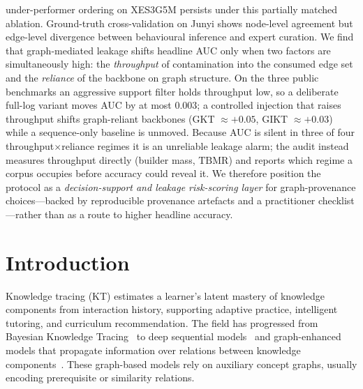 \documentclass[pdflatex,sn-mathphys-num]{sn-jnl}
\newcommand{\KCs}{knowledge components}
\begin{document}
{under-performer ordering on XES3G5M persists under this partially matched
ablation.
Ground-truth cross-validation on Junyi shows node-level agreement but
edge-level divergence between behavioural inference and expert curation.
We find that graph-mediated leakage shifts headline AUC only when two
factors are simultaneously high: the \emph{throughput} of contamination into
the consumed edge set and the \emph{reliance} of the backbone on graph
structure. On the three public benchmarks an aggressive support filter holds
throughput low, so a deliberate full-log variant moves AUC by at most $0.003$;
a controlled injection that raises throughput shifts graph-reliant backbones
(GKT ${\approx}{+}0.05$, GIKT ${\approx}{+}0.03$) while a sequence-only
baseline is unmoved. Because AUC is silent in three of four
throughput$\times$reliance regimes it is an unreliable leakage alarm; the
audit instead measures throughput directly (builder mass, $\mathrm{TBMR}$) and
reports which regime a corpus occupies before accuracy could reveal it. We
therefore position the protocol as a \emph{decision-support and leakage
risk-scoring layer} for graph-provenance choices---backed by reproducible
provenance artefacts and a practitioner checklist---rather than as a route to
higher headline accuracy.}


\maketitle

\section{Introduction}
\label{sec:intro}
Knowledge tracing (KT) estimates a learner's latent mastery of
\KCs{} from interaction history, supporting adaptive practice,
intelligent tutoring, and curriculum recommendation. The field has
progressed from Bayesian Knowledge Tracing~\cite{corbett1995bkt} to
deep sequential models~\cite{piech2015dkt,zhang2017dkvmn,ghosh2020akt,liu2023simplekt,pandey2019rkt,shen2021saint} and graph-enhanced models
that propagate information over relations between
\KCs{}~\cite{nakagawa2019gkt,tong2020skt,yang2021gikt,dygkt2024,dgekt2024,chen2023hgkt}. These graph-based models rely on
auxiliary concept graphs, usually encoding prerequisite or similarity
relations.
\end{document}
